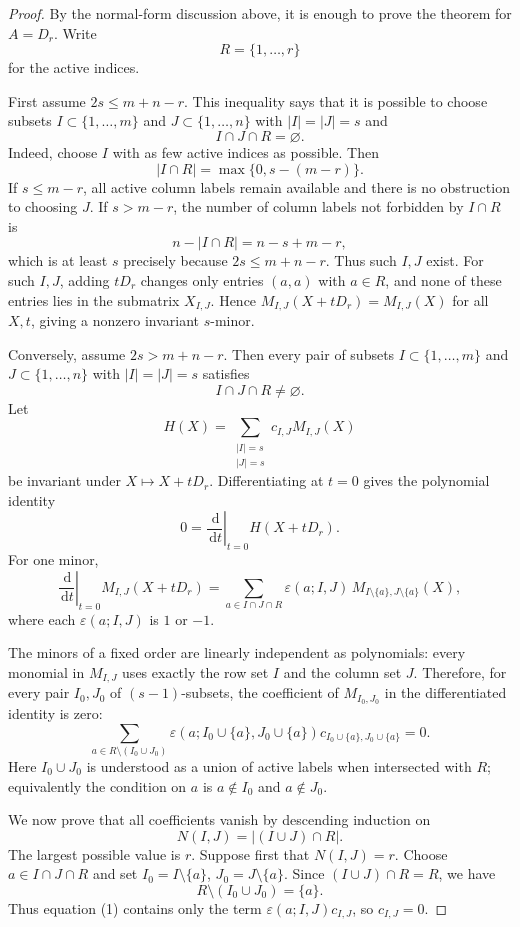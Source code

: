 \documentclass[11pt]{article}
\newcommand{\dd}{\,\mathrm d}
\begin{document}
\begin{proof}
By the normal-form discussion above, it is enough to prove the theorem for
$A=D_r$. Write
\[
  R=\{1,\dots,r\}
\]
for the active indices.

First assume $2s\le m+n-r$. This inequality says that it is possible to choose
subsets $I\subset\{1,\dots,m\}$ and $J\subset\{1,\dots,n\}$ with
$|I|=|J|=s$ and
\[
  I\cap J\cap R=\varnothing.
\]
Indeed, choose $I$ with as few active indices as possible. Then
\[
  |I\cap R|=\max\{0,s-(m-r)\}.
\]
If $s\le m-r$, all active column labels remain available and there is no
obstruction to choosing $J$. If $s>m-r$, the number of column labels not
forbidden by $I\cap R$ is
\[
  n-|I\cap R|=n-s+m-r,
\]
which is at least $s$ precisely because $2s\le m+n-r$. Thus such $I,J$ exist.
For such $I,J$, adding $tD_r$ changes only entries $(a,a)$ with $a\in R$, and
none of these entries lies in the submatrix $X_{I,J}$. Hence
$M_{I,J}(X+tD_r)=M_{I,J}(X)$ for all $X,t$, giving a nonzero invariant
$s$-minor.

Conversely, assume $2s>m+n-r$. Then every pair of subsets
$I\subset\{1,\dots,m\}$ and $J\subset\{1,\dots,n\}$ with $|I|=|J|=s$ satisfies
\[
  I\cap J\cap R\ne\varnothing.
\]
Let
\[
  H(X)=\sum_{\substack{|I|=s\\ |J|=s}}c_{I,J}M_{I,J}(X)
\]
be invariant under $X\mapsto X+tD_r$. Differentiating at $t=0$ gives the
polynomial identity
\[
  0=\left.\frac{\dd}{\dd t}\right|_{t=0}H(X+tD_r).
\]
For one minor,
\[
  \left.\frac{\dd}{\dd t}\right|_{t=0}M_{I,J}(X+tD_r)
  =
  \sum_{a\in I\cap J\cap R}
  \varepsilon(a;I,J)\,M_{I\setminus\{a\},J\setminus\{a\}}(X),
\]
where each $\varepsilon(a;I,J)$ is $1$ or $-1$.

The minors of a fixed order are linearly independent as polynomials: every
monomial in $M_{I,J}$ uses exactly the row set $I$ and the column set $J$.
Therefore, for every pair $I_0,J_0$ of $(s-1)$-subsets, the coefficient of
$M_{I_0,J_0}$ in the differentiated identity is zero:
\[
  \sum_{a\in R\setminus (I_0\cup J_0)}
  \varepsilon(a;I_0\cup\{a\},J_0\cup\{a\})
  c_{I_0\cup\{a\},J_0\cup\{a\}}=0.
  \tag{1}
\]
Here $I_0\cup J_0$ is understood as a union of active labels when intersected
with $R$; equivalently the condition on $a$ is $a\notin I_0$ and $a\notin J_0$.

We now prove that all coefficients vanish by descending induction on
\[
  N(I,J)=|(I\cup J)\cap R|.
\]
The largest possible value is $r$. Suppose first that $N(I,J)=r$. Choose
$a\in I\cap J\cap R$ and set $I_0=I\setminus\{a\}$,
$J_0=J\setminus\{a\}$. Since $(I\cup J)\cap R=R$, we have
\[
  R\setminus (I_0\cup J_0)=\{a\}.
\]
Thus equation (1) contains only the term
$\varepsilon(a;I,J)c_{I,J}$, so $c_{I,J}=0$.


\end{proof}
\end{document}
